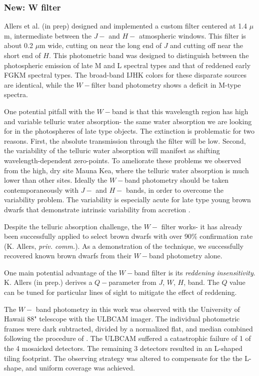 \subsubsection{New: W filter}
Allers et al. (in prep) designed and implemented a custom filter centered at 1.4 $\mu$m, intermediate between the $J-$ and $H-$ atmospheric windows.  This filter is about 0.2 $\mu$m wide, cutting on near the long end of $J$ and cutting off near the short end of $H$.  This photometric band was designed to distinguish between the photospheric emission of late M and L spectral types and that of reddened early FGKM spectral types.  The broad-band IJHK colors for these disparate sources are identical, while the $W-$filter band photometry shows a deficit in M-type spectra.

One potential pitfall with the $W-$band is that this wavelength region has high and variable telluric water absorption- the same water absorption we are looking for in the photospheres of late type objects.  The extinction is problematic for two reasons.  First, the absolute transmission through the filter will be low.  Second, the variability of the telluric water absorption will manifest as shifting wavelength-dependent zero-points. To ameliorate these problems we observed from the high, dry site Mauna Kea, where the telluric water absorption is much lower than other sites.  Ideally the $W-$band photometry should be taken contemporaneously with $J-$ and $H-$ bands, in order to overcome the variability problem.  The variability is especially acute for late type young brown dwarfs that demonstrate intrinsic variability from accretion \citep{2008A&A...485..155A,2014AJ....147...82C}.

Despite the telluric absorption challenge, the $W-$ filter works- it has already been successfully applied to select brown dwarfs with over 90\% confirmation rate (K. Allers, \emph{priv. comm.}).  As a demonstration of the technique, we successfully recovered known brown dwarfs from their $W-$band photometry alone.  

One main potential advantage of the $W-$band filter is its \emph{reddening insensitivity}.  K. Allers (in prep.) derives a $Q-$parameter from $J$, $W$, $H$, band.  The $Q$ value can be tuned for particular lines of sight to mitigate the effect of reddening.  

The $W-$ band photometry in this work was observed with the University of Hawaii 88" telescope with the ULBCAM imager.  The individual photometric frames were dark subtracted, divided by a normalized flat, and median combined following the procedure of \cite{allers06}.  The ULBCAM suffered a catastrophic failure of 1 of the 4 mosaicked detectors.  The remaining 3 detectors resulted in an L-shaped tiling footprint.  The observing strategy was altered to compensate for the the L-shape, and uniform coverage was achieved.


